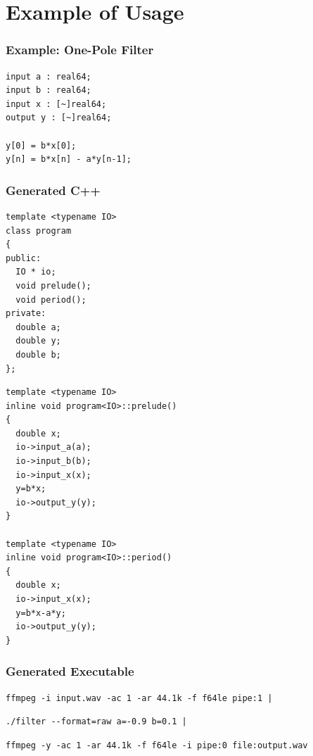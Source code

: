 \documentclass{beamer}
\begin{document}
\section{Example of Usage}

\begin{frame}[fragile]
\frametitle{Example: One-Pole Filter}

\centering

\begin{BVerbatim}
input a : real64;
input b : real64;
input x : [~]real64;
output y : [~]real64;

y[0] = b*x[0];
y[n] = b*x[n] - a*y[n-1];
\end{BVerbatim}

\end{frame}


\begin{frame}[fragile]
\frametitle{Generated C++}

\footnotesize
\begin{minipage}{0.49\linewidth}
\begin{BVerbatim}
template <typename IO>
class program
{
public:
  IO * io;
  void prelude();
  void period();
private:
  double a;
  double y;
  double b;
};
\end{BVerbatim}
\end{minipage}\hfill
\begin{minipage}{0.49\linewidth}
\begin{BVerbatim}
template <typename IO>
inline void program<IO>::prelude()
{
  double x;
  io->input_a(a);
  io->input_b(b);
  io->input_x(x);
  y=b*x;
  io->output_y(y);
}

template <typename IO>
inline void program<IO>::period()
{
  double x;
  io->input_x(x);
  y=b*x-a*y;
  io->output_y(y);
}
\end{BVerbatim}
\end{minipage}

\end{frame}


\begin{frame}[fragile]
\frametitle{Generated Executable}

\small

\begin{Verbatim}
ffmpeg -i input.wav -ac 1 -ar 44.1k -f f64le pipe:1 |
\end{Verbatim}

{
\bf
\begin{Verbatim}
./filter --format=raw a=-0.9 b=0.1 |
\end{Verbatim}
}

\begin{Verbatim}
ffmpeg -y -ac 1 -ar 44.1k -f f64le -i pipe:0 file:output.wav
\end{Verbatim}

\end{frame}
\end{document}
